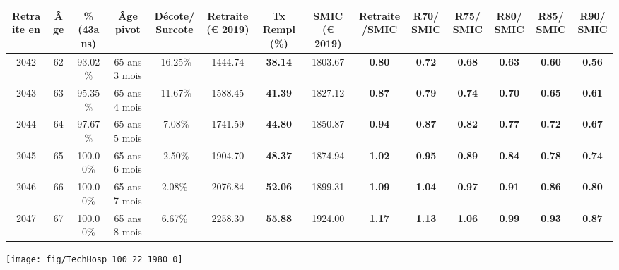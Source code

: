 \begin{adjustbox}{max width=\textwidth} 
\begin{tabular}[htb]{|c|c||c|c|c||c|c||c|c||c|c|c|c|c|} 
\hline 
 Retraite en &  Âge &  \%(43ans) &  Âge pivot &  Décote/Surcote &  Retraite (\euro{} 2019) &  Tx Rempl(\%) &  SMIC (\euro{} 2019) &  Retraite/SMIC &  R70/SMIC &  R75/SMIC &  R80/SMIC &  R85/SMIC &  R90/SMIC \\ 
\hline \hline 
 2042 &  62 &  93.02\% &  65 ans 3 mois &  -16.25\% &  1444.74 &  {\bf 38.14} &  1803.67 &  {\bf {\color{red} 0.80}} &  {\bf {\color{red} 0.72}} &  {\bf {\color{red} 0.68}} &  {\bf {\color{red} 0.63}} &  {\bf {\color{red} 0.60}} &  {\bf {\color{red} 0.56}} \\ 
\hline 
 2043 &  63 &  95.35\% &  65 ans 4 mois &  -11.67\% &  1588.45 &  {\bf 41.39} &  1827.12 &  {\bf {\color{red} 0.87}} &  {\bf {\color{red} 0.79}} &  {\bf {\color{red} 0.74}} &  {\bf {\color{red} 0.70}} &  {\bf {\color{red} 0.65}} &  {\bf {\color{red} 0.61}} \\ 
\hline 
 2044 &  64 &  97.67\% &  65 ans 5 mois &  -7.08\% &  1741.59 &  {\bf 44.80} &  1850.87 &  {\bf {\color{red} 0.94}} &  {\bf {\color{red} 0.87}} &  {\bf {\color{red} 0.82}} &  {\bf {\color{red} 0.77}} &  {\bf {\color{red} 0.72}} &  {\bf {\color{red} 0.67}} \\ 
\hline 
 2045 &  65 &  100.00\% &  65 ans 6 mois &  -2.50\% &  1904.70 &  {\bf 48.37} &  1874.94 &  {\bf 1.02} &  {\bf {\color{red} 0.95}} &  {\bf {\color{red} 0.89}} &  {\bf {\color{red} 0.84}} &  {\bf {\color{red} 0.78}} &  {\bf {\color{red} 0.74}} \\ 
\hline 
 2046 &  66 &  100.00\% &  65 ans 7 mois &  2.08\% &  2076.84 &  {\bf 52.06} &  1899.31 &  {\bf 1.09} &  {\bf 1.04} &  {\bf {\color{red} 0.97}} &  {\bf {\color{red} 0.91}} &  {\bf {\color{red} 0.86}} &  {\bf {\color{red} 0.80}} \\ 
\hline 
 2047 &  67 &  100.00\% &  65 ans 8 mois &  6.67\% &  2258.30 &  {\bf 55.88} &  1924.00 &  {\bf 1.17} &  {\bf 1.13} &  {\bf 1.06} &  {\bf {\color{red} 0.99}} &  {\bf {\color{red} 0.93}} &  {\bf {\color{red} 0.87}} \\ 
\hline 
\hline 
\end{tabular} 
\end{adjustbox} 
 
 \vspace{0.1cm} 

 {\hspace{-2.2cm}\texttt{[image: fig/TechHosp\_100\_22\_1980\_0]}} 

